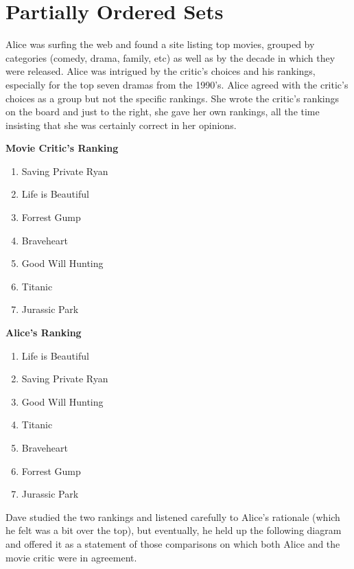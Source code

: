 
\chapter{Partially Ordered Sets}\label{ch:posets}

Alice was surfing the web and found a site listing top movies, grouped
by categories (comedy, drama, family, etc) as well as by the decade in 
which they were released.  Alice was intrigued by the critic's choices
and his rankings, especially for the top seven dramas from the 1990's.
Alice agreed with the critic's choices as a group but not the
specific rankings.  She wrote the critic's rankings on the board
and just to the right, she gave her own rankings, all the time
insisting that she was certainly correct in her opinions.


\begin{center}
\begin{minipage}{.45\textwidth}
\noindent
\textbf{Movie Critic's Ranking}

\begin{enumerate}
\item Saving Private Ryan 
\item Life is Beautiful 
\item Forrest Gump
\item Braveheart
\item Good Will Hunting
\item Titanic
\item Jurassic Park
\end{enumerate}
\end{minipage}
\begin{minipage}{.45\textwidth}
\noindent
\textbf{Alice's Ranking}

\begin{enumerate}
\item Life is Beautiful 
\item Saving Private Ryan 
\item Good Will Hunting
\item Titanic
\item Braveheart
\item Forrest Gump
\item Jurassic Park
\end{enumerate}
\end{minipage}
\end{center}

Dave studied the two rankings and listened carefully to Alice's rationale
(which he felt was a bit over the top), but eventually, he held up the following
diagram and offered it as a statement of those comparisons on which both Alice
and the movie critic were in agreement. 


